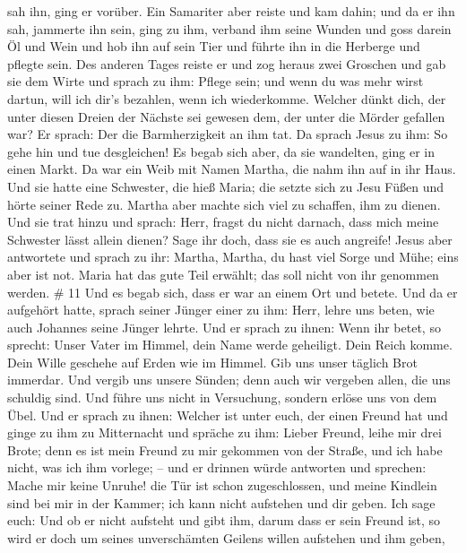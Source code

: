 sah ihn, ging er vorüber.  Ein Samariter aber reiste und
kam dahin; und da er ihn sah, jammerte ihn sein,  ging zu
ihm, verband ihm seine Wunden und goss darein Öl und Wein und hob ihn
auf sein Tier und führte ihn in die Herberge und pflegte sein.
 Des anderen Tages reiste er und zog heraus zwei Groschen
und gab sie dem Wirte und sprach zu ihm: Pflege sein; und wenn du was
mehr wirst dartun, will ich dir's bezahlen, wenn ich wiederkomme.
 Welcher dünkt dich, der unter diesen Dreien der Nächste
sei gewesen dem, der unter die Mörder gefallen war?  Er
sprach: Der die Barmherzigkeit an ihm tat. Da sprach Jesus zu ihm: So
gehe hin und tue desgleichen!  Es begab sich aber, da sie
wandelten, ging er in einen Markt. Da war ein Weib mit Namen Martha, die
nahm ihn auf in ihr Haus.  Und sie hatte eine Schwester,
die hieß Maria; die setzte sich zu Jesu Füßen und hörte seiner Rede zu.
 Martha aber machte sich viel zu schaffen, ihm zu dienen.
Und sie trat hinzu und sprach: Herr, fragst du nicht darnach, dass mich
meine Schwester lässt allein dienen? Sage ihr doch, dass sie es auch
angreife!  Jesus aber antwortete und sprach zu ihr: Martha,
Martha, du hast viel Sorge und Mühe;  eins aber ist not.
Maria hat das gute Teil erwählt; das soll nicht von ihr genommen werden.
\# 11  Und es begab sich, dass er war an einem Ort und
betete. Und da er aufgehört hatte, sprach seiner Jünger einer zu ihm:
Herr, lehre uns beten, wie auch Johannes seine Jünger lehrte.
 Und er sprach zu ihnen: Wenn ihr betet, so sprecht: Unser
Vater im Himmel, dein Name werde geheiligt. Dein Reich komme. Dein Wille
geschehe auf Erden wie im Himmel.  Gib uns unser täglich
Brot immerdar.  Und vergib uns unsere Sünden; denn auch wir
vergeben allen, die uns schuldig sind. Und führe uns nicht in
Versuchung, sondern erlöse uns von dem Übel.  Und er sprach
zu ihnen: Welcher ist unter euch, der einen Freund hat und ginge zu ihm
zu Mitternacht und spräche zu ihm: Lieber Freund, leihe mir drei Brote;
 denn es ist mein Freund zu mir gekommen von der Straße, und
ich habe nicht, was ich ihm vorlege; --  und er drinnen
würde antworten und sprechen: Mache mir keine Unruhe! die Tür ist schon
zugeschlossen, und meine Kindlein sind bei mir in der Kammer; ich kann
nicht aufstehen und dir geben.  Ich sage euch: Und ob er
nicht aufsteht und gibt ihm, darum dass er sein Freund ist, so wird er
doch um seines unverschämten Geilens willen aufstehen und ihm geben,
